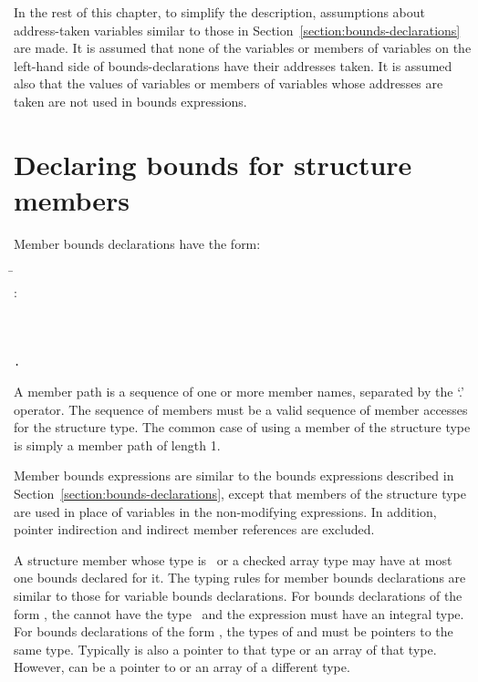 In the rest of this chapter, to simplify the description, assumptions
about address-taken variables similar to those in
Section~\ref{section:bounds-declarations} are made.
It is assumed that none of the variables or members of variables on the
left-hand side of bounds-declarations have their addresses taken. It is
assumed also that the values of variables or members of variables whose
addresses are taken are not used in bounds expressions.

\section{Declaring bounds for structure members}

Member bounds declarations have the form:
\begin{tabbing}
\=\\
\>  :  \\
\\
\\
\>  \\
\>  \texttt{.} 
\end{tabbing}

A member path is a sequence of one or more member names, separated by
the `.' operator. The sequence of members must be a valid sequence of
member accesses for the structure type. The common case of using a
member of the structure type is simply a member path of length 1.

Member bounds expressions are similar to the bounds expressions
described in Section~\ref{section:bounds-declarations}, 
except that members of the structure type are
used in place of variables in the non-modifying expressions. In
addition, pointer indirection and indirect member references are
excluded.

A structure member whose type is \arrayptr\ or a
checked array type may have at most one bounds declared for it. The
typing rules for member bounds declarations are similar to those for
variable bounds declarations. For bounds declarations of the form
, the
 cannot have the type \arrayptrvoid\ and
the expression  must have an integral type. For bounds declarations
of the form ,
the types of  and  must be pointers to the same type.
Typically  is also  a pointer to that type or an
array of that type.  However,  can be a pointer to
or an array of a different type.

